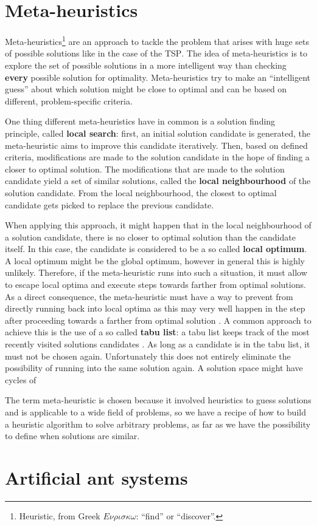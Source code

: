 \section{Meta-heuristics}
\label{chp:meta_heuristics}
Meta-heuristics\footnote{Heuristic, from Greek $E\nu\rho\iota\sigma\kappa\omega$: \enquote{find} or \enquote{discover}.} are an approach to tackle the problem that arises with huge sets of possible solutions like in the case of the \textsc{TSP}. The idea of meta-heuristics is to explore the set of possible solutions in a more intelligent way than checking \textbf{every} possible solution for optimality. Meta-heuristics try to make an \enquote{intelligent guess} about which solution might be close to optimal and can be based on different, problem-specific criteria.

One thing different meta-heuristics have in common is a solution finding principle, called \textbf{local search}: first, an initial solution candidate is generated, the meta-heuristic aims to improve this candidate iteratively. Then, based on defined criteria, modifications are made to the solution candidate in the hope of finding a closer to optimal solution. The modifications that are made to the solution candidate yield a set of similar solutions, called the \textbf{local neighbourhood} of the solution candidate. From the local neighbourhood, the closest to optimal candidate gets picked to replace the previous candidate.

When applying this approach, it might happen that in the local neighbourhood of a solution candidate, there is no closer to optimal solution than the candidate itself. In this case, the candidate is considered to be a so called \textbf{local optimum}. A local optimum might be the global optimum, however in general this is highly unlikely. Therefore, if the meta-heuristic runs into such a situation, it must allow to escape local optima and execute steps towards farther from optimal solutions. As a direct consequence, the meta-heuristic must have a way to prevent from directly running back into local optima as this may very well happen in the step after proceeding towards a farther from optimal solution \cite{}. A common approach to achieve this is the use of a so called \textbf{tabu list}: a tabu list keeps track of the most recently visited solutions candidates \cite{}. As long as a candidate is in the tabu list, it must not be chosen again. Unfortunately this does not entirely eliminate the possibility of running into the same solution again. A solution space might have cycles of 

The term meta-heuristic is chosen because it involved heuristics to guess solutions and is applicable to a wide field of problems, so we have a recipe of how to build a heuristic algorithm to solve arbitrary problems, as far as we have the possibility to define when solutions are similar.

\section{Artificial ant systems}
